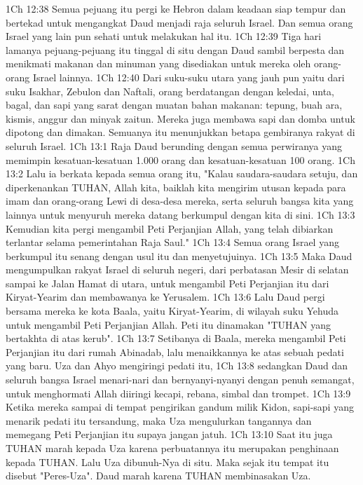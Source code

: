 1Ch 12:38  Semua pejuang itu pergi ke Hebron dalam keadaan siap tempur dan bertekad untuk mengangkat Daud menjadi raja seluruh Israel. Dan semua orang Israel yang lain pun sehati untuk melakukan hal itu.
1Ch 12:39  Tiga hari lamanya pejuang-pejuang itu tinggal di situ dengan Daud sambil berpesta dan menikmati makanan dan minuman yang disediakan untuk mereka oleh orang-orang Israel lainnya.
1Ch 12:40  Dari suku-suku utara yang jauh pun yaitu dari suku Isakhar, Zebulon dan Naftali, orang berdatangan dengan keledai, unta, bagal, dan sapi yang sarat dengan muatan bahan makanan: tepung, buah ara, kismis, anggur dan minyak zaitun. Mereka juga membawa sapi dan domba untuk dipotong dan dimakan. Semuanya itu menunjukkan betapa gembiranya rakyat di seluruh Israel.
1Ch 13:1  Raja Daud berunding dengan semua perwiranya yang memimpin kesatuan-kesatuan 1.000 orang dan kesatuan-kesatuan 100 orang.
1Ch 13:2  Lalu ia berkata kepada semua orang itu, "Kalau saudara-saudara setuju, dan diperkenankan TUHAN, Allah kita, baiklah kita mengirim utusan kepada para imam dan orang-orang Lewi di desa-desa mereka, serta seluruh bangsa kita yang lainnya untuk menyuruh mereka datang berkumpul dengan kita di sini.
1Ch 13:3  Kemudian kita pergi mengambil Peti Perjanjian Allah, yang telah dibiarkan terlantar selama pemerintahan Raja Saul."
1Ch 13:4  Semua orang Israel yang berkumpul itu senang dengan usul itu dan menyetujuinya.
1Ch 13:5  Maka Daud mengumpulkan rakyat Israel di seluruh negeri, dari perbatasan Mesir di selatan sampai ke Jalan Hamat di utara, untuk mengambil Peti Perjanjian itu dari Kiryat-Yearim dan membawanya ke Yerusalem.
1Ch 13:6  Lalu Daud pergi bersama mereka ke kota Baala, yaitu Kiryat-Yearim, di wilayah suku Yehuda untuk mengambil Peti Perjanjian Allah. Peti itu dinamakan "TUHAN yang bertakhta di atas kerub".
1Ch 13:7  Setibanya di Baala, mereka mengambil Peti Perjanjian itu dari rumah Abinadab, lalu menaikkannya ke atas sebuah pedati yang baru. Uza dan Ahyo mengiringi pedati itu,
1Ch 13:8  sedangkan Daud dan seluruh bangsa Israel menari-nari dan bernyanyi-nyanyi dengan penuh semangat, untuk menghormati Allah diiringi kecapi, rebana, simbal dan trompet.
1Ch 13:9  Ketika mereka sampai di tempat pengirikan gandum milik Kidon, sapi-sapi yang menarik pedati itu tersandung, maka Uza mengulurkan tangannya dan memegang Peti Perjanjian itu supaya jangan jatuh.
1Ch 13:10  Saat itu juga TUHAN marah kepada Uza karena perbuatannya itu merupakan penghinaan kepada TUHAN. Lalu Uza dibunuh-Nya di situ. Maka sejak itu tempat itu disebut "Peres-Uza". Daud marah karena TUHAN membinasakan Uza.
